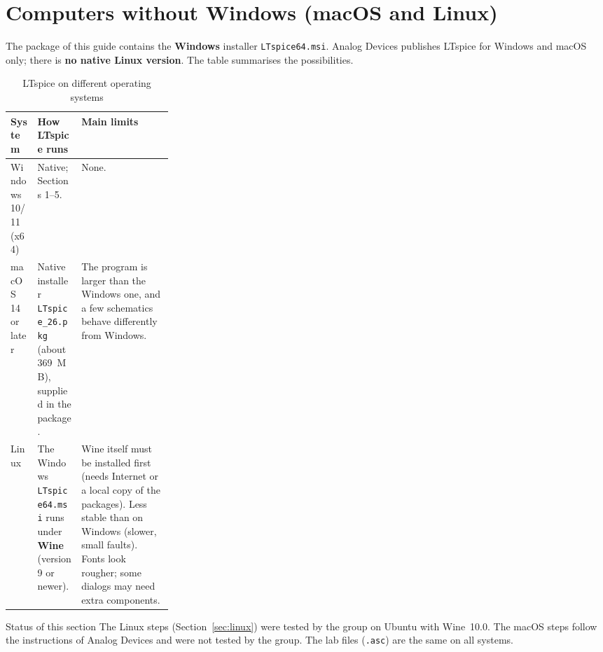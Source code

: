 \section{Computers without Windows (macOS and Linux)}\label{sec:other}
The package of this guide contains the \textbf{Windows} installer \texttt{LTspice64.msi}. Analog Devices
publishes LTspice for Windows and macOS only; there is \textbf{no native Linux version}. The table
summarises the possibilities.

\begin{table}[H]\centering\renewcommand{\arraystretch}{1.25}
\begin{tabularx}{\linewidth}{l >{\raggedright\arraybackslash}p{0.27\linewidth} X}
\toprule
\textbf{System} & \textbf{How LTspice runs} & \textbf{Main limits} \\ \midrule
Windows 10/11 (x64) & Native; Sections 1--5. & None. \\
macOS 14 or later & Native installer \texttt{LTspice\_26.pkg} (about 369~MB), supplied in the package. &
  The program is larger
  than the Windows one, and a few schematics behave differently from Windows. \\
Linux & The Windows \texttt{LTspice64.msi} runs under \textbf{Wine} (version 9 or newer). &
  Wine itself must be installed first (needs Internet or a local copy of the packages). Less stable than on Windows (slower, small faults). Fonts look
  rougher; some dialogs may need extra components. \\
\bottomrule
\end{tabularx}
\caption{LTspice on different operating systems}
\end{table}

\begin{notebox}{Status of this section}
The Linux steps (Section~\ref{sec:linux}) were tested by the group on Ubuntu with Wine~10.0. The macOS steps
follow the instructions of Analog Devices and were not tested by the group. The lab files (\texttt{.asc}) are
the same on all systems.
\end{notebox}

